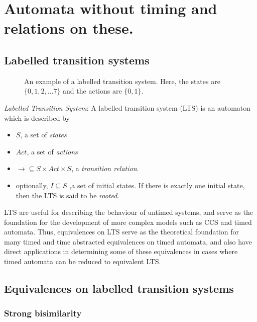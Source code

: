 \chapter{Automata without timing and relations on  these.}

\section{Labelled transition systems}

\begin{SCfigure}
  \centering
  \def\svgwidth{0.3\columnwidth}
  
  \caption{An example of a labelled transition system. Here, the
    states are $\{0, 1, 2, \ldots 7\}$ and the actions are $\{0,
    1\}$.}
  \label{lts01}
\end{SCfigure}

\begin{definition}
  \emph{Labelled Transition System}: A labelled transition system (LTS)
  \cite{Keller:1976:FVP:360248.360251} is an automaton which is
  described by
  \begin{itemize}
  \item $S$, a set of \emph{states} 
  \item $Act$, a set of \emph{actions}
  \item $\rightarrow \subseteq S \times Act \times S$, a \emph{transition
    relation}.
  \item optionally, $I \subseteq S$ ,a set of initial states. If there
    is exactly one initial state, then the LTS is said to be \emph{rooted}.
  \end{itemize}
\end{definition}

LTS are useful for describing the behaviour of untimed systems, and
serve as the foundation for the development of more complex models
such as CCS and timed automata. Thus, equivalences on LTS serve
as the theoretical foundation for many timed and time abstracted
equivalences on timed automata, and also have direct applications in
determining some of these equivalences in cases where timed automata
can be reduced to equivalent LTS.

\section{Equivalences on labelled transition systems}

\subsection{Strong bisimilarity}

